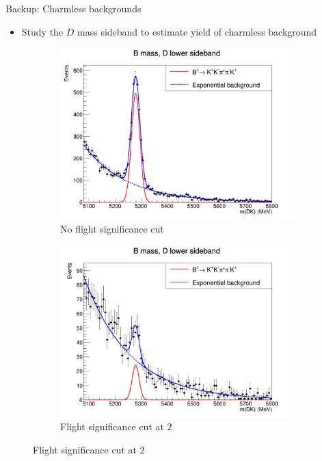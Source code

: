 \documentclass{beamer}
\begin{document}
\begin{frame}{Backup: Charmless backgrounds}
  \begin{itemize}
    \setlength\itemsep{1.3em}
    \item{Study the $D$ mass sideband to estimate yield of charmless background}
  \end{itemize}
  \begin{figure}
    \centering
    \begin{subfigure}{0.5\textwidth}
      \centering
      \includegraphics[width = 1.0\textwidth]{../Report/Plots/B2DKLower_Charmless.png}
      \caption{No flight significance cut}
    \end{subfigure}%
    \begin{subfigure}{0.5\textwidth}
      \centering
      \includegraphics[width = 1.0\textwidth]{../Report/Plots/B2DKLowerFDCut_Charmless.png}
      \caption{Flight significance cut at $2$}
    \end{subfigure}
  \end{figure}
\end{frame}
\end{document}
